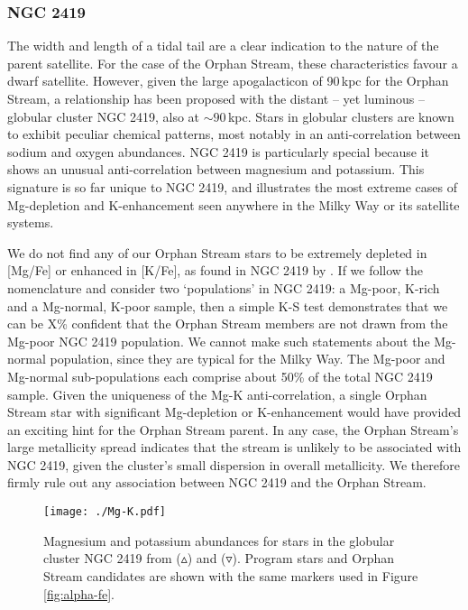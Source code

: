 \documentclass{emulateapj}
\begin{document}
\subsubsection{NGC 2419}
The width and length of a tidal tail are a clear indication to the nature of the parent satellite. For the case of the Orphan Stream, these characteristics favour a dwarf satellite. However, given the large apogalacticon of 90\,kpc for the Orphan Stream, a relationship has been proposed with the distant -- yet luminous -- globular cluster NGC 2419, also at $\sim90$\,kpc. Stars in globular clusters are known to exhibit peculiar chemical patterns, most notably in an anti-correlation between sodium and oxygen abundances. NGC 2419 is particularly special because it shows an unusual anti-correlation between magnesium and potassium. This signature is so far unique to NGC 2419, and illustrates the most extreme cases of Mg-depletion and K-enhancement seen anywhere in the Milky Way or its satellite systems.


We do not find any of our Orphan Stream stars to be extremely depleted in [Mg/Fe] or enhanced in [K/Fe], as found in NGC 2419 by \citet{coco;et-al}. If we follow the \citet{who} nomenclature and consider two `populations' in NGC 2419: a Mg-poor, K-rich and  a Mg-normal, K-poor sample, then a simple K-S test demonstrates that we can be X\% confident that the Orphan Stream members are not drawn from the Mg-poor NGC 2419 population. We cannot make such statements about the Mg-normal population, since they are typical for the Milky Way. The Mg-poor and Mg-normal sub-populations each comprise about 50\% of the total NGC 2419 sample. Given the uniqueness of the Mg-K anti-correlation, a single Orphan Stream star with significant Mg-depletion or K-enhancement would have provided an exciting hint for the Orphan Stream parent. In any case, the Orphan Stream's large metallicity spread indicates that the stream is unlikely to be associated with NGC 2419, given the cluster's small dispersion in overall metallicity. We therefore firmly rule out any association between NGC 2419 and the Orphan Stream.

\begin{figure}[h]
	\texttt{[image: ./Mg-K.pdf]}
	\caption{Magnesium and potassium abundances for stars in the globular cluster NGC 2419 from \citet{cohen;et-al} ($\vartriangle$) and \citet{mucciarelli;et-al} ($\triangledown$). Program stars and Orphan Stream candidates are shown with the same markers used in Figure \ref{fig:alpha-fe}.}
	\label{fig:mg-k}
\end{figure}
\end{document}
